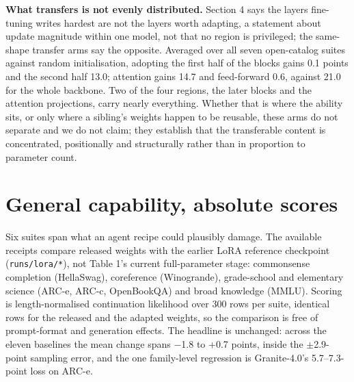 \documentclass{article}
\begin{document}
\textbf{What transfers is not evenly distributed.} Section 4 says the layers fine-tuning writes hardest are not the layers worth adapting, a statement about update magnitude within one model, not that no region is privileged; the same-shape transfer arms say the opposite. Averaged over all seven open-catalog suites against random initialisation, adopting the first half of the blocks gains 0.1 points and the second half 13.0; attention gains 14.7 and feed-forward 0.6, against 21.0 for the whole backbone. Two of the four regions, the later blocks and the attention projections, carry nearly everything. Whether that is where the ability sits, or only where a sibling's weights happen to be reusable, these arms do not separate and we do not claim; they establish that the transferable content is concentrated, positionally and structurally rather than in proportion to parameter count.
\section{General capability, absolute scores}


Six suites span what an agent recipe could plausibly damage. The available receipts compare
released weights with the earlier LoRA reference checkpoint (\texttt{runs/lora/*}),
not Table 1's current full-parameter stage: commonsense completion
(HellaSwag), coreference (Winogrande), grade-school and elementary science (ARC-e, ARC-c,
OpenBookQA) and broad knowledge (MMLU). Scoring is length-normalised continuation likelihood
over 300 rows per suite, identical rows for the released and the adapted weights, so the
comparison is free of prompt-format and generation effects. The headline is
unchanged: across the eleven baselines the mean change spans $-$1.8 to +0.7 points, inside
the $\pm$2.9-point sampling error, and the one family-level regression is Granite-4.0's
5.7--7.3-point loss on ARC-e.
\end{document}
